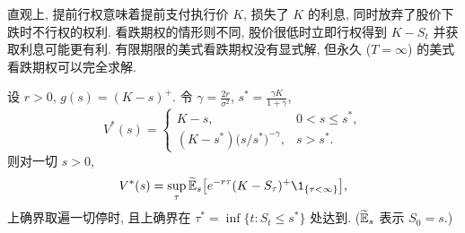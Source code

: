 直观上, 提前行权意味着提前支付执行价 $K$, 损失了 $K$ 的利息, 同时放弃了股价下跌时不行权的权利. 看跌期权的情形则不同, 股价很低时立即行权得到 $K-S_t$ 并获取利息可能更有利. 有限期限的美式看跌期权没有显式解, 但永久 ($T=\infty$) 的美式看跌期权可以完全求解.

\begin{theorem}[永久美式看跌期权]\label{thm:perpetual-put}
设 $r>0$, $g(s)=(K-s)^+$. 令 $\gamma=\frac{2r}{\sigma^2}$, $s^*=\frac{\gamma K}{1+\gamma}$,
\[
V^*(s)=\begin{cases}K-s,&0<s\le s^*,\\(K-s^*)\big(s/s^*\big)^{-\gamma},&s>s^*.\end{cases}
\]
则对一切 $s>0$,
\[
V^*(s)=\sup_\tau\widetilde{\E}_s\big[e^{-r\tau}(K-S_\tau)^+\1_{\{\tau<\infty\}}\big],
\]
上确界取遍一切停时, 且上确界在 $\tau^*=\inf\{t:S_t\le s^*\}$ 处达到. ($\widetilde{\mathbb{E}}_s$ 表示 $S_0=s$.)
\end{theorem}


